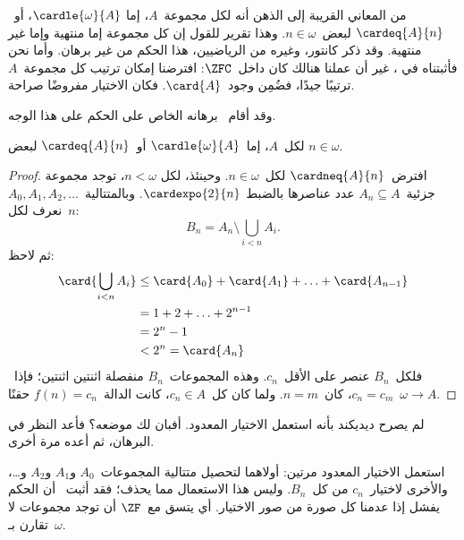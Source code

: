 \documentclass[../../../include/open-logic-section]{subfiles}
\begin{document}
\begin{ex}
من المعاني القريبة إلى الذهن أنه لكل مجموعة~$A$، إما
$\cardle{\omega}{A}$، أو~$\cardeq{A}{n}$ لبعض~$n \in \omega$. وهذا
تقرير للقول إن كل مجموعة إما منتهية وإما غير منتهية. وقد ذكر كانتور،
وغيره من الرياضيين، هذا الحكم من غير برهان. وأما نحن فأثبتناه في
، غير أن عملنا
هنالك كان داخل~$\ZFC$: افترضنا إمكان ترتيب كل مجموعة~$A$ ترتيبًا
جيدًا، فضُمِن وجود~$\card{A}$. فكان الاختيار مفروضًا صراحة.

وقد أقام~\citet{Dedekind1888} برهانه الخاص على الحكم على هذا الوجه.

\begin{thm}
لكل~$A$، إما~$\cardle{\omega}{A}$ أو~$\cardeq{A}{n}$ لبعض
$n \in \omega$.
\end{thm}

\begin{proof}
افترض~$\cardneq{A}{n}$ لكل~$n \in \omega$. وحينئذ، لكل
$n < \omega$، توجد مجموعة جزئية~$A_n \subseteq A$ عدد عناصرها بالضبط
$\cardexpo{2}{n}$. وبالمتتالية~$A_0, A_1, A_2, \ldots$ نعرف لكل~$n$:
\[
	B_n = A_n \setminus \bigcup_{i < n} A_i.
\]
ثم لاحظ:
\begin{align*}
	\card{\bigcup_{i < n}A_i}
	&\leq \card{A_0} + \card{A_1} + \ldots + \card{A_{n-1}}\\
	&=1 + 2 + \ldots + 2^{n-1}\\
	& = 2^n - 1\\
	& < 2^n = \card{A_n}
\end{align*}
فلكل~$B_n$ عنصر على الأقل~$c_n$. وهذه المجموعات~$B_n$ منفصلة اثنتين
اثنتين؛ فإذا~$c_n = c_m$، كان~$n = m$. ولما كان كل~$c_n \in A$،
كانت الدالة~$f(n) = c_n$ حقنًا~$\omega \to A$.
\end{proof}
\noindent
لم يصرح ديديكند بأنه استعمل الاختيار المعدود. أفبان لك موضعه؟ فأعد
النظر في البرهان، ثم أعده مرة أخرى.

استعمل الاختيار المعدود مرتين: أولاهما لتحصيل متتالية المجموعات~$A_0$
و$A_1$ و$A_2$ و\dots\@، والأخرى لاختيار~$c_n$ من كل~$B_n$. وليس
هذا الاستعمال مما يحذف؛ فقد أثبت~\citet[p.~138]{Cohen1966} أن الحكم
يفشل إذا عدمنا كل صورة من صور الاختيار. أي يتسق مع~$\ZF$ أن توجد
مجموعات لا تقارن بـ~$\omega$.
\end{ex}
\end{document}
